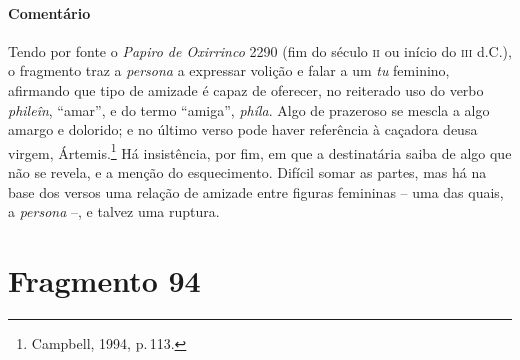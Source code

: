 \medskip

{\paragraph{Comentário} Tendo por fonte o \textit{Papiro de Oxirrinco} 2290 (fim do século \textsc{ii} ou início do \textsc{iii} d.C.), o fragmento traz a \textit{persona} a expressar volição e falar a um \textit{tu} feminino, afirmando que tipo de amizade é capaz de oferecer, no reiterado uso do verbo \textit{phileîn}, ``amar'', e do termo ``amiga'', \textit{phíla}. Algo de prazeroso se mescla a algo amargo e dolorido; e no último verso pode haver 
referência à caçadora deusa virgem, Ártemis.\footnote{Campbell, 1994, p.\,113.} Há insistência, por fim, em que a destinatária saiba de algo que não se revela, e a menção do esquecimento. Difícil somar as partes, mas há na base dos versos  uma relação de amizade entre figuras femininas -- uma das quais, a \textit{persona} --, e talvez uma ruptura.}




\pagebreak
\section{Fragmento 94}

